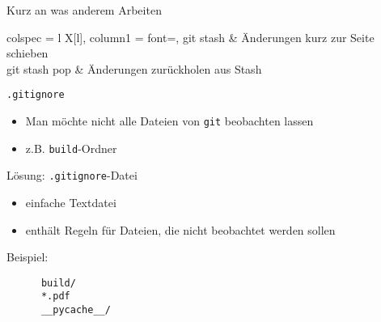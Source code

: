 \begin{frame}{Kurz an was anderem Arbeiten}
  \begin{tblr}{
      colspec = {l X[l]},
      column{1} = {font=\ttfamily},
    }
    git stash     & Änderungen kurz zur Seite schieben \\
    git stash pop & Änderungen zurückholen aus Stash
  \end{tblr}
\end{frame}

\begin{frame}[fragile]{\texttt{.gitignore}}
    \begin{itemize}
    \item Man möchte nicht alle Dateien von \texttt{git} beobachten lassen
    \item z.B. \texttt{build}-Ordner
    \end{itemize}
    \begin{center}
        \Large Lösung: \texttt{.gitignore}-Datei
    \end{center}

    \begin{itemize}
    \item einfache Textdatei
    \item enthält Regeln für Dateien, die nicht beobachtet werden sollen
    \end{itemize}
    Beispiel:
    \vspace{1em}
    \begin{verbatim}
      build/
      *.pdf
      __pycache__/
    \end{verbatim}
\end{frame}


